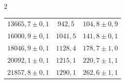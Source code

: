 \documentclass[12pt,twosides,onecolumn,openany]{article}
\newenvironment{Figura}
  {\par\medskip\noindent\minipage{\linewidth}}
  {\endminipage\par\medskip}
\begin{document}
\begin{multicols}{2}
\begin{Figura}
{\begin{tabular}{c|c|c}
      $13665,7 \pm 0,1$ & $942,5$ & $104,8 \pm 0,9$ \\ 
      $16000,9 \pm 0,1$ & $1041,5$ & $141,8 \pm 0,1$ \\ 
      $18046,9 \pm 0,1$ & $1128,4$ & $178,7 \pm 1,0$ \\ 
      $20092,1 \pm 0,1$ & $1215,1$ & $220,7 \pm 1,1$ \\ 
      $21857,8 \pm 0,1$ & $1290,1$ & $262,6 \pm 1,1$ \\ 
    \end{tabular}
  }
  \label{tau:DC_calculades}
\end{Figura}
\end{multicols}
 

\end{document}
